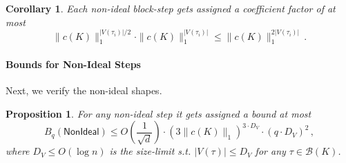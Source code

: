 \documentclass[12pt]{article}
\newtheorem{proposition}[theorem]{Proposition}
\newtheorem{corollary}[theorem]{Corollary}
\newcommand{\calB}{\mathcal{B}}
\begin{document}
\begin{corollary}Each non-ideal block-step gets assigned a coefficient factor of at most \[ 
\|c(K)\|_1^{  |V(\tau_i)|/2}\cdot \|c(K)\|_1^{|V(\tau_i)|} \leq \|c(K)\|_1^{2|V(\tau_i)|}
\,.\]
\end{corollary}
 	
 	
\paragraph{Bounds for Non-Ideal Steps}
Next, we verify the non-ideal shapes.
\begin{proposition} \label{prop:block0non-ideal-M}
	For any non-ideal step it gets assigned a bound at most \[ 
	B_q(\mathsf{NonIdeal})  \leq O(\frac{1}{\sqrt{d}}) \cdot  (3\|c(K)\|_1)^{ 3\cdot D_V} \cdot (q\cdot D_V)^2 \,, 	\]
	where $D_V \leq O(\log n) $ is the size-limit s.t. $|V(\tau)|\leq D_V$ for any $\tau\in \calB(K)$.
\end{proposition}
\end{document}

